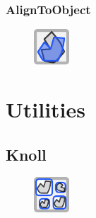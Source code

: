 \documentclass{ol-softwaremanual}
\begin{document}
\subsubsection{AlignToObject}
\begin{figure}[h]
    \centering
    \includegraphics[width = .5\textwidth]{figures/Icons/ALIGNTOOBJECT.pdf}
\end{figure}

\section{Utilities}

\subsection{Knoll}
\begin{figure}[h]
    \centering
    \includegraphics[width = .5\textwidth]{figures/Icons/KNOLL.pdf}
\end{figure}
\end{document}
